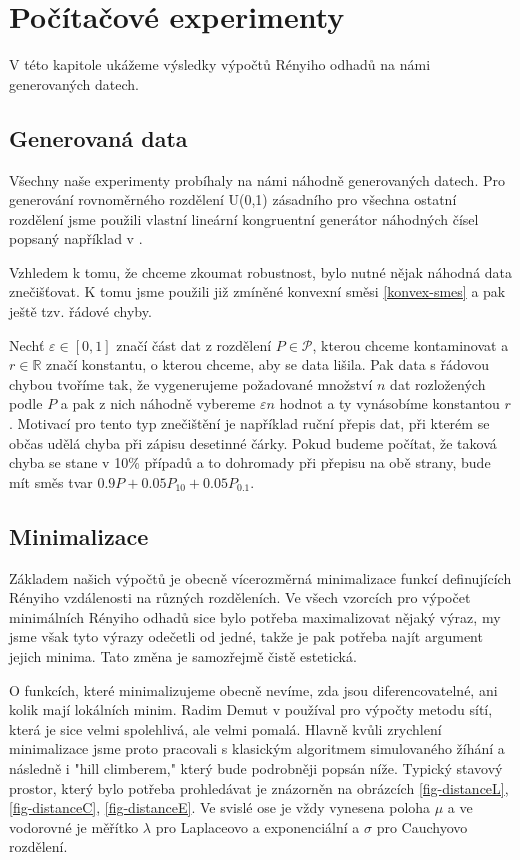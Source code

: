 \chapter{Počítačové experimenty}

V této kapitole ukážeme výsledky výpočtů Rényiho odhadů na námi generovaných datech. 

\section{Generovaná data}
Všechny naše experimenty probíhaly na námi náhodně generovaných datech. Pro generování rovnoměrného rozdělení U(0,1) zásadního pro všechna ostatní rozdělení jsme použili vlastní lineární kongruentní generátor náhodných čísel popsaný například v \cite{Virius98}. 

Vzhledem k tomu, že chceme zkoumat robustnost, bylo nutné nějak  náhodná data znečišťovat. K tomu jsme použili již zmíněné konvexní směsi \eqref{konvex-smes} a pak ještě tzv. řádové chyby. 

Nechť $\varepsilon \in [0,1]$ značí část dat z rozdělení $P \in \mathcal{P}$, kterou chceme kontaminovat a $r \in \mathbb{R}$ značí konstantu, o kterou chceme, aby se data lišila. Pak data s řádovou chybou tvoříme tak, že vygenerujeme požadované množství $n$ dat rozložených podle $P$ a pak z nich náhodně vybereme $\varepsilon n$ hodnot a ty vynásobíme konstantou $r$. Motivací pro tento typ znečištění je například ruční přepis dat, při kterém se občas udělá chyba při zápisu desetinné čárky. Pokud budeme počítat, že taková chyba se stane v 10\% případů a to dohromady při přepisu na obě strany, bude mít směs tvar $0.9P + 0.05P_{10} + 0.05P_{0.1}$.

\section{Minimalizace}
Základem našich výpočtů je obecně vícerozměrná minimalizace funkcí definujících Rényiho vzdálenosti na různých rozděleních. Ve všech vzorcích pro výpočet minimálních Rényiho odhadů sice bylo potřeba maximalizovat nějaký výraz, my jsme však tyto výrazy odečetli od jedné, takže je pak potřeba najít argument jejich minima. Tato změna je samozřejmě čistě estetická.

O funkcích, které minimalizujeme obecně nevíme, zda jsou diferencovatelné, ani kolik mají lokálních minim. Radim Demut v \cite{Demut2010} používal pro výpočty metodu sítí, která je sice velmi spolehlivá, ale velmi pomalá. Hlavně kvůli zrychlení minimalizace jsme proto pracovali s klasickým algoritmem simulovaného žíhání a následně i "hill climberem," který bude podrobněji popsán níže. Typický stavový prostor, který bylo potřeba prohledávat je znázorněn na obrázcích \ref{fig-distanceL}, \ref{fig-distanceC}, \ref{fig-distanceE}. Ve svislé ose je vždy vynesena poloha $\mu$ a ve vodorovné je měřítko $\lambda$ pro Laplaceovo a exponenciální a $\sigma$ pro Cauchyovo rozdělení.

